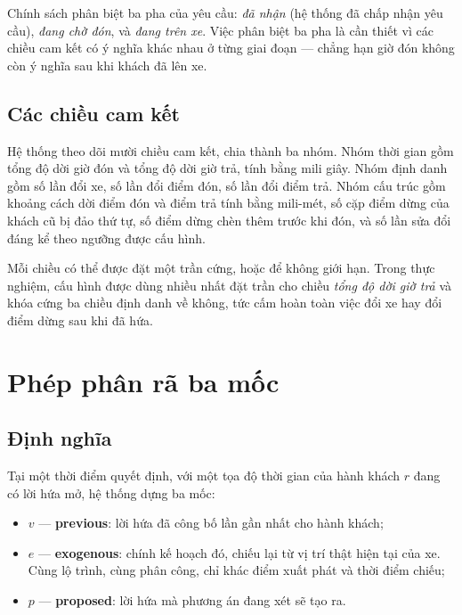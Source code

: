 Chính sách phân biệt ba pha của yêu cầu: \emph{đã nhận} (hệ thống đã chấp nhận yêu cầu),
\emph{đang chờ đón}, và \emph{đang trên xe}. Việc phân biệt ba pha
là cần thiết vì các chiều cam kết có ý nghĩa khác nhau ở từng giai đoạn --- chẳng hạn giờ đón
không còn ý nghĩa sau khi khách đã lên xe.

\subsection{Các chiều cam kết}

Hệ thống theo dõi mười chiều cam kết, chia thành ba nhóm. Nhóm thời gian gồm tổng độ dời giờ
đón và tổng độ dời giờ trả, tính bằng mili giây. Nhóm định danh gồm số lần đổi xe, số lần đổi
điểm đón, số lần đổi điểm trả. Nhóm cấu trúc gồm khoảng cách dời điểm đón và điểm trả tính bằng
mili-mét, số cặp điểm dừng của khách cũ bị đảo thứ tự, số điểm dừng chèn thêm trước khi đón, và số lần sửa
đổi đáng kể theo ngưỡng được cấu hình.

Mỗi chiều có thể được đặt một trần cứng, hoặc để không giới hạn. Trong thực nghiệm, cấu hình
được dùng nhiều nhất đặt trần cho chiều \emph{tổng độ dời giờ trả} và khóa cứng ba chiều định
danh về không, tức cấm hoàn toàn việc đổi xe hay đổi điểm dừng sau khi đã hứa.

\section{Phép phân rã ba mốc}
\label{muc:bamoc}

\subsection{Định nghĩa}
\label{muc:dinhnghia-bamoc}

Tại một thời điểm quyết định, với một tọa độ thời gian của hành khách $r$ đang có lời hứa mở,
hệ thống dựng ba mốc:

\begin{itemize}[leftmargin=1.2cm,itemsep=2pt,topsep=3pt]
\item $v$ --- \textbf{previous}: lời hứa đã công bố lần gần nhất cho hành khách;
\item $e$ --- \textbf{exogenous}: chính kế hoạch đó, chiếu lại từ vị trí thật hiện tại của xe.
Cùng lộ trình, cùng phân công, chỉ khác điểm xuất phát và thời điểm chiếu;
\item $p$ --- \textbf{proposed}: lời hứa mà phương án đang xét sẽ tạo ra.
\end{itemize}


